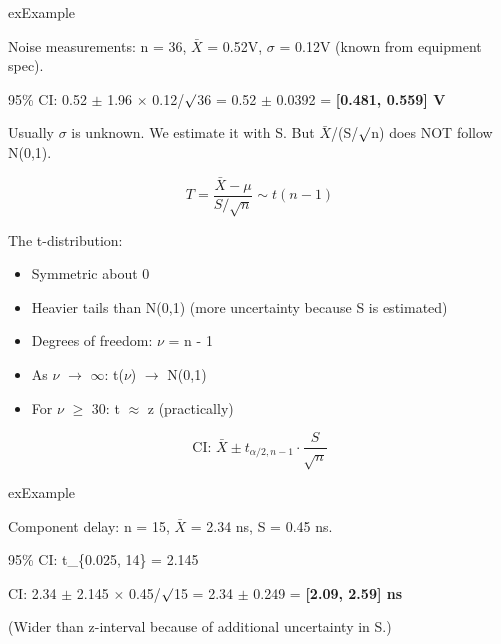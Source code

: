 \begin{PSbox}[unbreakable]{ex}{Example}

Noise measurements: n = 36, \ensuremath{\bar{X}} = 0.52V, \ensuremath{\sigma} = 0.12V (known from equipment spec).

95\% CI: 0.52 \ensuremath{\pm} 1.96 \ensuremath{\times} 0.12/\ensuremath{\surd}36 = 0.52 \ensuremath{\pm} 0.0392 = \textbf{[0.481, 0.559] V}

\end{PSbox}



Usually \ensuremath{\sigma} is unknown. We estimate it with S. But \ensuremath{\bar{X}}/(S/\ensuremath{\surd}n) does NOT follow N(0,1).


\[T = \frac{\bar{X} - \mu}{S/\sqrt{n}} \sim t(n-1)\]

The t-distribution:

\begin{itemize}
\tightlist
\item
  Symmetric about 0
\item
  Heavier tails than N(0,1) (more uncertainty because S is estimated)
\item
  Degrees of freedom: \ensuremath{\nu} = n - 1
\item
  As \ensuremath{\nu} \ensuremath{\to} \ensuremath{\infty}: t(\ensuremath{\nu}) \ensuremath{\to} N(0,1)
\item
  For \ensuremath{\nu} \ensuremath{\ge} 30: t \ensuremath{\approx} z (practically)
\end{itemize}


\[\text{CI: } \bar{X} \pm t_{\alpha/2, n-1} \cdot \frac{S}{\sqrt{n}}\]

\begin{PSbox}[unbreakable]{ex}{Example}

Component delay: n = 15, \ensuremath{\bar{X}} = 2.34 ns, S = 0.45 ns.

95\% CI: t\_\{0.025, 14\} = 2.145

CI: 2.34 \ensuremath{\pm} 2.145 \ensuremath{\times} 0.45/\ensuremath{\surd}15 = 2.34 \ensuremath{\pm} 0.249 = \textbf{[2.09, 2.59] ns}

(Wider than z-interval because of additional uncertainty in S.)

\end{PSbox}

